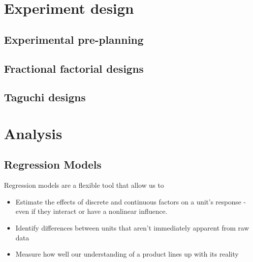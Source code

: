 \documentclass[11pt,a4paper,article]{memoir} %
\begin{document}
\section{Experiment design}
\subsection*{Experimental pre-planning}
\subsection*{Fractional factorial designs}
\subsection*{Taguchi designs}

\section{Analysis}
\subsection*{Regression Models}
Regression models are a flexible tool that allow us to
\begin{itemize}
\item Estimate the effects of discrete and continuous factors on a unit's response - even if they interact or have a nonlinear influence.
\item Identify differences between units that aren't immediately apparent from raw data
\item Measure how well our understanding of a product lines up with its reality
\end{itemize}

\newpage
\end{document}
